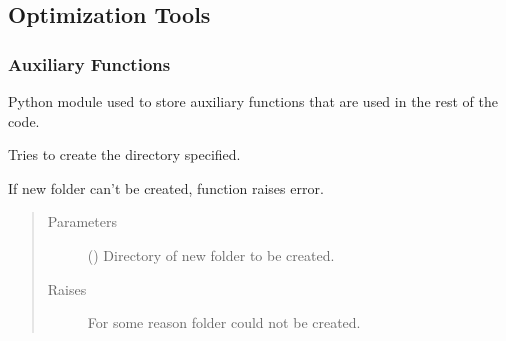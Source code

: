 \documentclass[letterpaper,10pt,english]{sphinxmanual}
\begin{document}
\subsection{Optimization Tools}
\label{\detokenize{source/optimization.opt_tools:optimization-tools}}\label{\detokenize{source/optimization.opt_tools::doc}}

\subsubsection{Auxiliary Functions}
\label{\detokenize{source/optimization.opt_tools:module-optimization.opt_tools.aux_funcs}}\label{\detokenize{source/optimization.opt_tools:auxiliary-functions}}
Python module used to store auxiliary functions that are used in the rest of the code.

\begin{fulllineitems}
\label{\detokenize{source/optimization.opt_tools:optimization.opt_tools.aux_funcs.create_folder}}
Tries to create the directory specified.

If new folder can’t be created, function raises error.
\begin{quote}\begin{description}
\item[{Parameters}] \leavevmode
{} () \textendash{} Directory of new folder to be created.

\item[{Raises}] \leavevmode
{} \textendash{} For some reason folder could not be created.

\end{description}\end{quote}

\end{fulllineitems}

\end{document}

